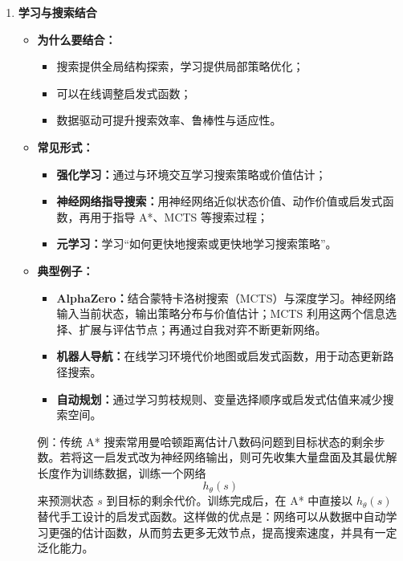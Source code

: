 \documentclass[../main.tex]{subfiles}
\begin{document}
\begin{enumerate}
{\textbf{第9步：处理 $(A,C)$，约束 $A\neq C$。}

此时
$$
D(A)=\{1\},\qquad D(C)=\{3\}
$$
检查 $A=1$：
$$
\exists\,C=3,\ \text{使得 }1\neq 3
$$
因此 $D(A)$ 不变，队列不新增弧。

\textbf{第10步：处理 $(C,A)$，约束 $A\neq C$。}

检查 $C=3$：
$$
\exists\,A=1,\ \text{使得 }1\neq 3
$$
因此 $D(C)$ 不变，队列不新增弧。

至此队列为空，AC-3 结束。最终结果为
$$
D(A)=\{1\},\qquad D(B)=\{2\},\qquad D(C)=\{3\}
$$
}

    \item \textbf{学习与搜索结合}
    \begin{itemize}
        \item \textbf{为什么要结合：}
        \begin{itemize}
            \item 搜索提供全局结构探索，学习提供局部策略优化；
            \item 可以在线调整启发式函数；
            \item 数据驱动可提升搜索效率、鲁棒性与适应性。
        \end{itemize}

        \item \textbf{常见形式：}
        \begin{itemize}
            \item \textbf{强化学习：}通过与环境交互学习搜索策略或价值估计；
            \item \textbf{神经网络指导搜索：}用神经网络近似状态价值、动作价值或启发式函数，再用于指导 A*、MCTS 等搜索过程；
            \item \textbf{元学习：}学习“如何更快地搜索或更快地学习搜索策略”。
        \end{itemize}

        \item \textbf{典型例子：}
        \begin{itemize}
            \item \textbf{AlphaZero：}结合蒙特卡洛树搜索（MCTS）与深度学习。神经网络输入当前状态，输出策略分布与价值估计；MCTS 利用这两个信息选择、扩展与评估节点；再通过自我对弈不断更新网络。
            \item \textbf{机器人导航：}在线学习环境代价地图或启发式函数，用于动态更新路径搜索。
            \item \textbf{自动规划：}通过学习剪枝规则、变量选择顺序或启发式估值来减少搜索空间。
        \end{itemize}

        {\small\kaishu
        例：传统 A* 搜索常用曼哈顿距离估计八数码问题到目标状态的剩余步数。若将这一启发式改为神经网络输出，则可先收集大量盘面及其最优解长度作为训练数据，训练一个网络
        $$
        h_\theta(s)
        $$
        来预测状态 $s$ 到目标的剩余代价。训练完成后，在 A* 中直接以 $h_\theta(s)$ 替代手工设计的启发式函数。这样做的优点是：网络可以从数据中自动学习更强的估计函数，从而剪去更多无效节点，提高搜索速度，并具有一定泛化能力。
        }
    \end{itemize}
\end{enumerate}
\end{document}
